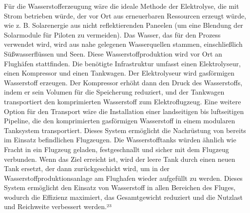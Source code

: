 Für die Wasserstofferzeugung wäre die ideale Methode der Elektrolyse, die mit Strom betrieben würde, der vor Ort aus 
erneuerbaren Ressourcen erzeugt würde, wie z. B. Solarenergie aus nicht reflektierenden Paneelen (um eine Blendung der 
Solarmodule für Piloten zu vermeiden). Das Wasser, das für den Prozess verwendet wird, wird aus nahe gelegenen 
Wasserquellen stammen, einschließlich Süßwasserflüssen und Seen. Diese Wasserstoffproduktion wird vor Ort an Flughäfen 
stattfinden. Die benötigte Infrastruktur umfasst einen Elektrolyseur, einen Kompressor und einen Tankwagen. 
Der Elektrolyseur wird gasförmigen Wasserstoff erzeugen. Der Kompressor erhöht dann den Druck des Wasserstoffs, 
indem er sein Volumen für die Speicherung reduziert, und der Tankwagen transportiert den komprimierten Wasserstoff 
zum Elektroflugzeug. Eine weitere Option für den Transport wäre die Installation einer landseitigen bis luftseitigen Pipeline,
 die den komprimierten gasförmigen Wasserstoff in einem modularen Tanksystem transportiert. Dieses System ermöglicht 
 die Nachrüstung von bereits im Einsatz befindlichen Flugzeugen. Die Wasserstofftanks würden ähnlich wie Fracht 
 in ein Flugzeug geladen, festgeschnallt und sicher mit dem Flugzeug verbunden. Wenn das Ziel erreicht ist, 
 wird der leere Tank durch einen neuen Tank ersetzt, der dann zurückgeschickt wird, um in der Wasserstoffproduktionsanlage 
 am Flughafen wieder aufgefüllt zu werden. Dieses System ermöglicht den Einsatz von Wasserstoff in allen Bereichen des Fluges,
  wodurch die Effizienz maximiert, das Gesamtgewicht reduziert und die Nutzlast und Reichweite verbessert werden.²³\cite{dalmia2022powering}

